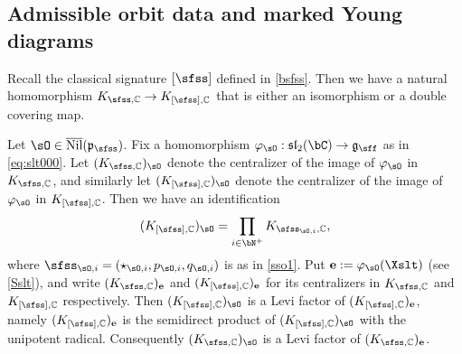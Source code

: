 \documentclass[11pt,a4paper]{amsart}
\def\fsl{\mathfrak{sl}}
\newcommand{\slt}{\operatorname{SL}_2(\mathbb{R})}
\newcommand{\g}{\mathfrak g}
\newcommand{\p}{\mathfrak p}
\newcommand{\X}{\mathbf{X}}
\numberwithin{equation}{section}
\theoremstyle{remark}
\def\slt{\fsl_2(\bC)}
\def\Nil{\overline{\mathrm{Nil}}}
\begin{document}
\subsection{Admissible orbit data and marked Young diagrams}
\label{sec:MYD}
\def\KCs{K_{[\sfss],\bC}}
\def\KCsX{(K_{[\sfss],\bC})_{\X}}
\def\KCsoX{(K_{[\sfss],\bC})_{\X}^{\circ}}

Recall the classical signature $[\sfss]$ defined in \eqref{bsfss}. Then we have a natural homomorphism $K_{\sfss,\C}\rightarrow K_{[\sfss],\C}$ that is either an isomorphism or a double covering map. 

Let $\sO\in\Nil(\p_\sfss)$. Fix a homomorphism  $\varphi_{\sO}: \slt\rightarrow \g_\sff$  as in \eqref{eq:slt000}. Let $(K_{\sfss, \C})_\sO$ denote the centralizer of the image of $\varphi_{\sO}$ in $K_{\sfss, \C}$, and similarly let $(K_{[\sfss], \C})_\sO$ denote the centralizer of the image of $\varphi_{\sO}$ in $K_{[\sfss], \C}$. Then we have an identification
\[
(K_{[\sfss], \C})_\sO= \prod_{i\in \bN^{+}} K_{\sfss_{\sO,i},\C},
\]
where $\sfss_{\sO,i}=(\star_{\sO,i}, p_{\sO,i}, q_{\sO,i})$ is as in \eqref{sso1}.
Put $\mathbf e:=\varphi_\sO(\Xslt)$ (see \eqref{Sslt}), and write $(K_{\sfss,\C})_\mathbf e$ and $(K_{[\sfss],\C})_\mathbf e$ for its centralizers in $K_{\sfss,\C}$ and $K_{[\sfss],\C}$ respectively. Then $(K_{[\sfss], \C})_\sO$ is a Levi factor of $(K_{[\sfss], \C})_\mathbf e$, namely $(K_{[\sfss], \C})_\mathbf e$ is the semidirect product of $(K_{[\sfss], \C})_\sO$ with the unipotent radical. Consequently  $(K_{\sfss, \C})_\sO$ is a Levi factor of $(K_{\sfss, \C})_\mathbf e$. 
\end{document}
